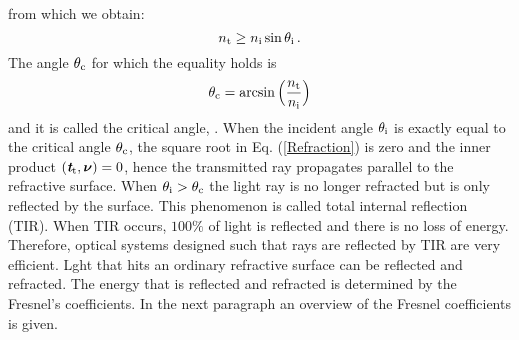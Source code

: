 from which we obtain:
\begin{equation}
 n_\textrm{t}\geq n_\textrm{i} \sin\theta_\textrm{i}\,.
\end{equation}
 The angle $\theta_{\textrm{c}}$ for which the equality holds is
\begin{equation}\label{critical}
\theta_{\textrm{c}} = \arcsin\Big(\frac{n_\textrm{t}}{n_\textrm{i}}\Big)
\end{equation} and it is called the critical angle, \cite{chaves2015introduction}.
When the incident angle $\theta_{\textrm{i}}$ is exactly equal to the critical angle $\theta_{\textrm{c}}$, the square root in Eq. (\ref{Refraction}) is zero and the inner product $(\textit{\textbf{t}}_\textrm{t},\boldsymbol{\nu})=0$, hence the transmitted ray propagates parallel to the refractive surface. 
When $\theta_{\textrm{i}}>\theta_{\textrm{c}}$ the light ray is no longer refracted but is only reflected by the surface. This phenomenon is called total internal reflection (TIR). When TIR occurs, $100\%$ of light is reflected and there is no loss of energy. Therefore, optical systems designed such that rays are reflected by TIR are very efficient. Lght that hits an ordinary refractive surface can be reflected and refracted. The energy that is reflected and refracted is determined by the Fresnel's coefficients.
In the next paragraph an overview of the Fresnel coefficients is given.

